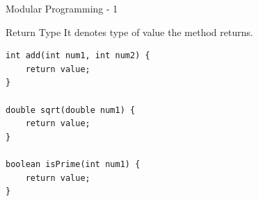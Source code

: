 \documentclass[14pt]{beamer}
\begin{document}
\begin{frame}[fragile]{Modular Programming - 1}
 \begin{block}{Return Type}
  It denotes type of value the method returns.
 \end{block}
\begin{minipage}{2cm}
 
\end{minipage}
\quad
\begin{minipage}{8cm}
 \begin{lstlisting}[numbers=none]
int add(int num1, int num2) {
    return value;
}

double sqrt(double num1) {
    return value;
}

boolean isPrime(int num1) {
    return value;
}
 \end{lstlisting}

\end{minipage}



\end{frame}
\end{document}
